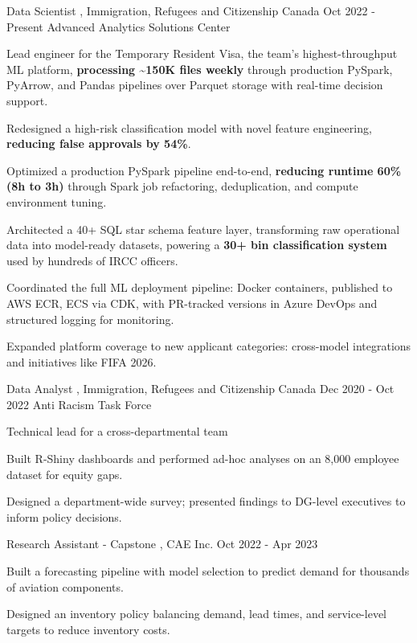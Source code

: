 \experienceheader
    {Data Scientist}
    {\small , Immigration, Refugees and Citizenship Canada}
    { Oct 2022 - Present}
    {Advanced Analytics Solutions Center}
\vspace{-1.5pt}
\begin{zitemize}
    \item Lead engineer for the Temporary Resident Visa, the team's highest-throughput ML platform, \textbf{processing \textasciitilde150K files weekly} through production PySpark, PyArrow, and Pandas pipelines over Parquet storage with real-time decision support. 
    \item Redesigned a high-risk classification model with novel feature engineering, \textbf{reducing false approvals by 54\%}.
    \item Optimized a production PySpark pipeline end-to-end, \textbf{reducing runtime 60\% (8h to 3h)} through Spark job refactoring, deduplication, and compute environment tuning.
    \item Architected a 40+ SQL star schema feature layer, transforming raw operational data into model-ready datasets, powering a \textbf{30+ bin classification system} used by hundreds of IRCC officers.
    \item Coordinated the full ML deployment pipeline: Docker containers, published to AWS ECR, ECS via CDK, with PR-tracked versions in Azure DevOps and structured logging for monitoring.
    \item Expanded platform coverage to new applicant categories: cross-model integrations and initiatives like FIFA 2026.
\end{zitemize}

\experienceheader
    {Data Analyst}
    {\small , Immigration, Refugees and Citizenship Canada}
    {Dec 2020 - Oct 2022}
    {Anti Racism Task Force}
\vspace{-1.5pt}
\begin{zitemize}
    \item Technical lead for a cross-departmental team
    \item Built R-Shiny dashboards and performed ad-hoc analyses on an 8,000 employee dataset for equity gaps.
    \item Designed a department-wide survey; presented findings to DG-level executives to inform policy decisions.
\end{zitemize}

\experienceheader
    {Research Assistant - Capstone}
    {\small , CAE Inc.}
    {Oct 2022 - Apr 2023}
    {}
\begin{zitemize}
    \item Built a forecasting pipeline with model selection to predict demand for thousands of aviation components.
    \item Designed an inventory policy balancing demand, lead times, and service-level targets to reduce inventory costs.
\end{zitemize}


